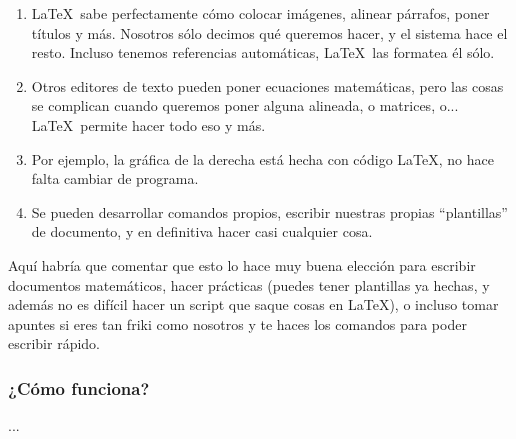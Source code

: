 \documentclass[10pt, compress,usetitleprogressbar,aspectratio=1610, notes]{beamer}
\begin{document}
\begin{frame}
{\begin{enumerate}
\item \LaTeX\ sabe perfectamente cómo colocar imágenes, alinear párrafos, poner títulos y más. Nosotros sólo decimos qué queremos hacer, y el sistema hace el resto. Incluso tenemos referencias automáticas, \LaTeX\ las formatea él sólo.
\item Otros editores de texto pueden poner ecuaciones matemáticas, pero las cosas se complican cuando queremos poner alguna alineada, o matrices, o... \LaTeX\ permite hacer todo eso y más.
\item Por ejemplo, la gráfica de la derecha está hecha con código \LaTeX, no hace falta cambiar de programa.
\item Se pueden desarrollar comandos propios, escribir nuestras propias ``plantillas'' de documento, y en definitiva hacer casi cualquier cosa.
\end{enumerate}

Aquí habría que comentar que esto lo hace muy buena elección para escribir documentos matemáticos, hacer prácticas (puedes tener plantillas ya hechas, y además no es difícil hacer un script que saque cosas en \LaTeX), o incluso tomar apuntes si eres tan friki como nosotros y te haces los comandos para poder escribir rápido.
}

\end{frame}

\begin{frame}
\frametitle{¿Cómo funciona?}

...
\end{frame}
\end{document}
